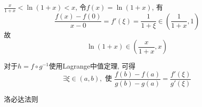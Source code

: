 \begin{example}
    $\displaystyle \frac{x}{1+x} < \ln \left( 1+x \right) < x$, 令$f\left( x \right) = \ln \left( 1+x \right) $, 有
    \begin{equation}
      \frac{f\left( x \right) - f\left( 0 \right) }{x - 0} = f'\left( \xi \right) = \frac{1}{1+\xi} \in \left( \frac{1}{1+x}, 1 \right) 
    \end{equation}
    故
    \begin{equation}
      \ln \left( 1+x \right) \in \left( \frac{x}{1+x}, x \right) 
    \end{equation}
\end{example}

\begin{theorem}[柯西中值定理]
    对于$h = f \circ g^{-1}$使用Lagrange中值定理, 可得
    \begin{equation}
      \exists \xi \in  (a,b) , \text{ 使 } \frac{f\left( b \right) - f\left( a \right) }{g\left( b \right) - g\left( a \right) } = \frac{f'\left( \xi \right) }{g'\left( \xi \right) }
    \end{equation}
\end{theorem}

洛必达法则